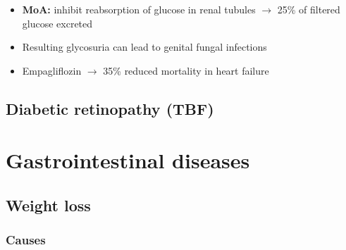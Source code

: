 \documentclass[
  12pt,
]{memoir}
\providecommand{\tightlist}{%
  \setlength{\itemsep}{0pt}\setlength{\parskip}{0pt}}
\begin{document}
\begin{itemize}
  \begin{itemize}
  \tightlist
  \item
    \textbf{MoA:} inhibit reabsorption of glucose in renal tubules
    \(\rightarrow\) 25\% of filtered glucose excreted
  \item
    Resulting glycosuria can lead to genital fungal infections
  \item
    Empagliflozin \(\rightarrow\) 35\% reduced mortality in heart
    failure
  \end{itemize}
\end{itemize}

\pagebreak

\hypertarget{diabetic-retinopathy-tbf}{%
\section{Diabetic retinopathy (TBF)}\label{diabetic-retinopathy-tbf}}

\pagebreak

\hypertarget{gastrointestinal-diseases}{%
\chapter{Gastrointestinal diseases}\label{gastrointestinal-diseases}}

\hypertarget{weight-loss}{%
\section{Weight loss}\label{weight-loss}}

\hypertarget{causes-5}{%
\subsection{Causes}\label{causes-5}}
\end{document}
